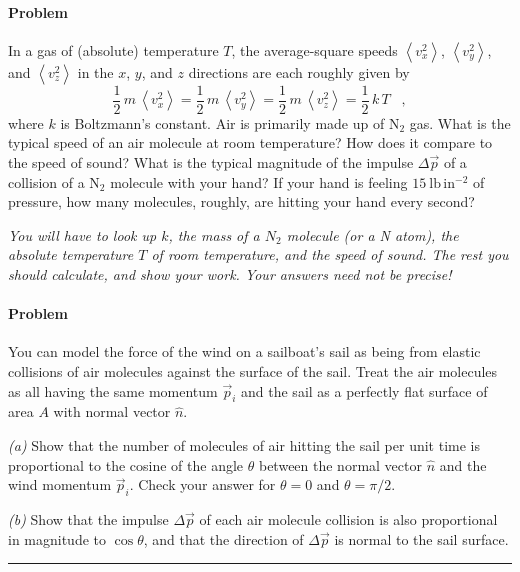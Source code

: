 \documentclass[12pt]{article}
\newcounter{problem}
\begin{document}
\paragraph{Problem~\theproblem}

In a gas of (absolute) temperature $T$, the average-square speeds
$\left<v_x^2\right>$, $\left<v_y^2\right>$, and $\left<v_z^2\right>$
in the $x$, $y$, and $z$ directions are each roughly given by
\begin{equation}
\frac{1}{2}\,m\,\left<v_x^2\right> =
\frac{1}{2}\,m\,\left<v_y^2\right> =
\frac{1}{2}\,m\,\left<v_z^2\right> =
\frac{1}{2}\,k\,T \nonumber \;\;\; ,
\end{equation}
where $k$ is Boltzmann's constant.  Air is primarily made up of
$\mathrm{N_2}$ gas.  What is the typical speed of an air molecule at
room temperature?  How does it compare to the speed of sound?  What is
the typical magnitude of the impulse $\Delta\vec{p}$ of a collision of
a $\mathrm{N_2}$ molecule with your hand?  If your hand is feeling
$15~\mathrm{lb\,in^{-2}}$ of pressure, how many molecules, roughly,
are hitting your hand every second?

\textit{You will have to look up $k$, the mass of a $N_2$ molecule (or
a N atom), the absolute temperature $T$ of room temperature, and the
speed of sound.  The rest you should calculate, and show your work.
Your answers need not be precise!}

\paragraph{Problem~\theproblem}

You can model the force of the wind on a sailboat's sail as being from
elastic collisions of air molecules against the surface of the sail.
Treat the air molecules as all having the same momentum $\vec{p}_i$
and the sail as a perfectly flat surface of area $A$ with normal
vector $\hat{n}$.

\textsl{(a)} Show that the number of molecules of air hitting the sail
per unit time is proportional to the cosine of the angle $\theta$
between the normal vector $\hat{n}$ and the wind momentum $\vec{p}_i$.
Check your answer for $\theta=0$ and $\theta=\pi/2$.

\textsl{(b)} Show that the impulse $\Delta\vec{p}$ of each air
molecule collision is also proportional in magnitude to $\cos\theta$,
and that the direction of $\Delta\vec{p}$ is normal to the sail
surface.
\\ \rule{0.3\textwidth}{0pt}
\end{document}
